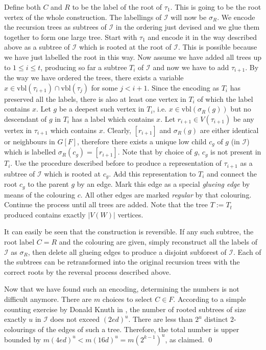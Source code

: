 \documentclass[11pt,a4paper]{article}
\begin{document}
Define both $C$ and $R$ to be the label of the root of $\tau_1$. This is going to be the root vertex of the whole construction. The labellings
of $\mathcal{I}$ will now be $\sigma_R$. We encode the recursion trees as subtrees of $\mathcal{I}$ in the ordering just devised
and we glue them together to form one large tree. Start with $\tau_1$ and encode it in the way described above as a subtree of
$\mathcal{I}$ which is rooted at the root of $\mathcal{I}$. This is possible because we have just labelled the root in this way.
Now assume we have added all trees up to $1 \le i \le t$, producing so far a subtree $T_i$ of $\mathcal{I}$ and now we have to add 
$\tau_{i+1}$. By the way we have ordered the trees,
there exists a variable $x \in \mbox{vbl}(\tau_{i+1}) \cap \mbox{vbl}(\tau_{j})$ for some $j < i+1$. Since the encoding as $T_i$ has
preserved all the labels, there is also at least one vertex in $T_i$ of which the label contains $x$. Let $g$ be a deepest such vertex
in $T_i$, i.e. $x \in \mbox{vbl}(\sigma_R(g))$ but no descendant of $g$ in $T_i$ has a label which contains $x$. Let $r_{i+1} \in V(\tau_{i+1})$ be any vertex in $\tau_{i+1}$
which contains $x$. Clearly, $[r_{i+1}]$ and $\sigma_R(g)$ are either identical or neighbours in $G[F]$, therefore there exists a unique 
low child $c_g$ of $g$ (in $\mathcal{I}$) which is labelled $\sigma_R(c_g) = [r_{i+1}]$. Note that by choice of $g$, $c_g$ is not present
in $T_i$. Use the procedure described before to produce
a representation of $\tau_{i+1}$ as a subtree of $\mathcal{I}$ which is rooted at $c_g$. Add this representation to $T_i$ and connect
the root $c_g$ to the parent $g$ by an edge. Mark this edge as a special \emph{glueing edge} by means of the colouring $c$. All other
edges are marked \emph{regular} by that colouring. Continue the process until all trees are added. Note that the tree $T := T_t$ produced
contains exactly $|V(W)|$ vertices.

It can easily be seen that the construction is reversible. If any such subtree, the root label $C=R$ and the colouring are given,
simply reconstruct all the labels of $\mathcal{I}$ as $\sigma_R$, then delete all glueing edges to produce a disjoint subforest
of $\mathcal{I}$. Each of the subtrees can be retransformed into the original recursion trees with the correct roots by the reversal
process described above. 

Now that we have found such an encoding, determining the numbers is not difficult anymore. There are $m$ choices to select
$C \in F$. According to a simple counting exercise by Donald Knuth in \cite{Knu69}, the number of rooted subtrees of size
exactly $u$ in $\mathcal{I}$ does not exceed $(2ed)^u$. There are less than $2^u$ distinct $2$-colourings of the edges of
such a tree. Therefore, the total number is upper bounded by $m(4ed)^u < m(16d)^u = m(2^{k-1})^u$, as claimed.
\qed
\end{document}
